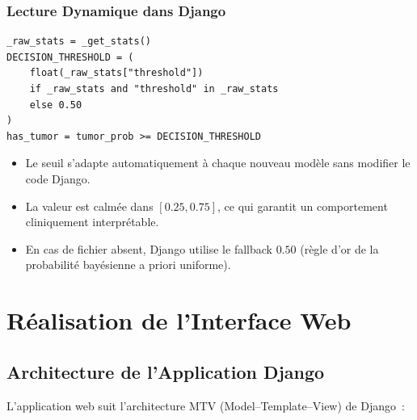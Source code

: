 \documentclass[12pt, a4paper]{report}
\begin{document}
\subsection{Lecture Dynamique dans Django}

\begin{lstlisting}[caption={Chargement du seuil optimal depuis JSON (views.py)},
                   label={lst:threshold_load}]
_raw_stats = _get_stats()
DECISION_THRESHOLD = (
    float(_raw_stats["threshold"])
    if _raw_stats and "threshold" in _raw_stats
    else 0.50
)
has_tumor = tumor_prob >= DECISION_THRESHOLD
\end{lstlisting}

\begin{successbox}
  \begin{itemize}
    \item Le seuil s'adapte automatiquement à chaque nouveau modèle
          sans modifier le code Django.
    \item La valeur est calmée dans $[0.25, 0.75]$, ce qui garantit
          un comportement cliniquement interprétable.
    \item En cas de fichier absent, Django utilise le fallback $0.50$
          (règle d'or de la probabilité bayésienne a priori uniforme).
  \end{itemize}
\end{successbox}

\chapter{Réalisation de l'Interface Web}
\label{chap:interface}

\section{Architecture de l'Application Django}

L'application web suit l'architecture MTV (Model–Template–View) de
Django~:
\end{document}
